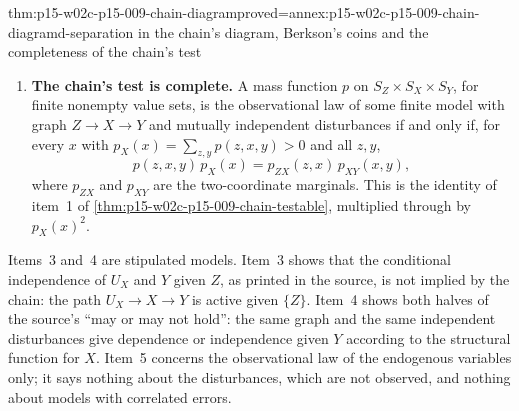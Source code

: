 \begin{hbtheorem}{thm:p15-w02c-p15-009-chain-diagram}{proved=annex:p15-w02c-p15-009-chain-diagram}{d-separation in the chain's diagram, Berkson's coins and the completeness of the chain's test}
\begin{enumerate}
      Put \(U_Z(a,b)=a\), \(U_X(a,b)=b\), \(\mathcal U_Y=\{0\}\),
      \(U_Y=0\), \(f_Z(u)=u\), \(f_X(z,u)=\max(z,u)\) and
      \(f_Y(x,u)=x\), so that \(X=Y=1\) is the report that at least one
      coin shows a tail. Then \(U_Z\) and \(U_X\) are independent, but
      \[
      \begin{aligned}
       \mathbb P(U_Z=1,U_X=1\mid Y=1)&=\tfrac13,\\
       \mathbb P(U_Z=1\mid Y=1)\,\mathbb P(U_X=1\mid Y=1)&=\tfrac49.
      \end{aligned}
      \]
      If instead \(f_X(z,u)=u\), with all else unchanged, then
      \(U_Z\mathrel{\perp\!\!\!\perp}U_X\mid Y\).
\item \textbf{The chain's test is complete.} A mass function \(p\) on
      \(S_Z\times S_X\times S_Y\), for finite nonempty value sets, is the
      observational law of some finite model with graph \(Z\to X\to Y\)
      and mutually independent disturbances if and only if, for every
      \(x\) with \(p_X(x)=\sum_{z,y}p(z,x,y)>0\) and all \(z,y\),
      \[
       p(z,x,y)\,p_X(x)=p_{ZX}(z,x)\,p_{XY}(x,y),
      \]
      where \(p_{ZX}\) and \(p_{XY}\) are the two-coordinate marginals.
      This is the identity of item~1 of
      \cref{thm:p15-w02c-p15-009-chain-testable}, multiplied through by
      \(p_X(x)^2\).
\end{enumerate}
\end{hbtheorem}

Items~3 and~4 are stipulated models. Item~3 shows that the conditional
independence of \(U_X\) and \(Y\) given \(Z\), as printed in the source,
is not implied by the chain: the path \(U_X\to X\to Y\) is active given
\(\{Z\}\). Item~4 shows both halves of the source's ``may or may not
hold'': the same graph and the same independent disturbances give
dependence or independence given \(Y\) according to the structural
function for \(X\). Item~5 concerns the observational law of the
endogenous variables only; it says nothing about the disturbances, which
are not observed, and nothing about models with correlated errors.

